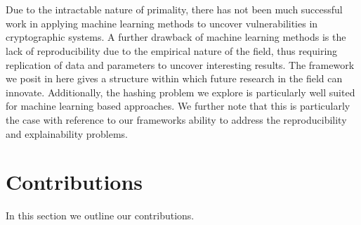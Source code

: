 \documentclass[letterpaper,twocolumn,10pt]{article}
\begin{document}
\\
\\
Due to the intractable nature of primality, there has not been much successful work in applying machine learning methods to uncover vulnerabilities in cryptographic systems. A further drawback of machine learning methods is the lack of reproducibility due to the empirical nature of the field, thus requiring replication of data and parameters to uncover interesting results. The framework we posit in here gives a structure within which future research in the field can innovate.  Additionally, the hashing problem we explore is particularly well suited for machine learning based approaches. We further note that this is particularly the case with reference to our frameworks ability to address the reproducibility and explainability problems. 

\section{Contributions}
In this section we outline our contributions. 
\end{document}
